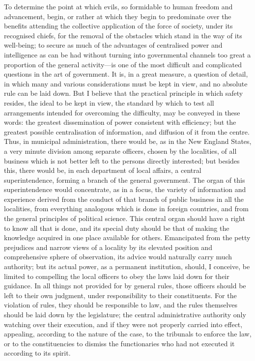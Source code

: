 \documentclass[11pt,openany]{book}
\begin{document}
To determine the point at which evils, so formidable to human freedom and advancement, begin, or rather at which they begin to predominate over the benefits attending the collective application of the force of society, under its recognised chiefs, for the removal of the obstacles which stand in the way of its well-being; to secure as much of the advantages of centralised power and intelligence as can be had without turning into governmental channels too great a proportion of the general activity---is one of the most difficult and complicated questions in the art of government. It is, in a great measure, a question of detail, in which many and various considerations must be kept in view, and no absolute rule can be laid down. But I believe that the practical principle in which safety resides, the ideal to be kept in view, the standard by which to test all arrangements intended for overcoming the difficulty, may be conveyed in these words: the greatest dissemination of power consistent with efficiency; but the greatest possible centralisation of information, and diffusion of it from the centre. Thus, in municipal administration, there would be, as in the New England States, a very minute division among separate officers, chosen by the localities, of all business which is not better left to the persons directly interested; but besides this, there would be, in each department of local affairs, a central superintendence, forming a branch of the general government. The organ of this superintendence would concentrate, as in a focus, the variety of information and experience derived from the conduct of that branch of public business in all the localities, from everything analogous which is done in foreign countries, and from the general principles of political science. This central organ should have a right to know all that is done, and its special duty should be that of making the knowledge acquired in one place available for others. Emancipated from the petty prejudices and narrow views of a locality by its elevated position and comprehensive sphere of observation, its advice would naturally carry much authority; but its actual power, as a permanent institution, should, I conceive, be limited to compelling the local officers to obey the laws laid down for their guidance. In all things not provided for by general rules, those officers should be left to their own judgment, under responsibility to their constituents. For the violation of rules, they should be responsible to law, and the rules themselves should be laid down by the legislature; the central administrative authority only watching over their execution, and if they were not properly carried into effect, appealing, according to the nature of the case, to the tribunals to enforce the law, or to the constituencies to dismiss the functionaries who had not executed it according to its spirit.
\end{document}
